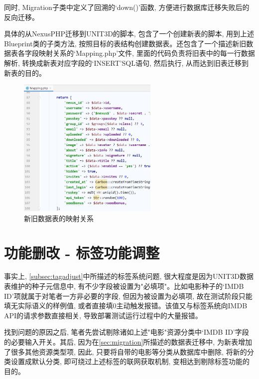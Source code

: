 同时, Migration子类中定义了回溯的`down()'函数, 方便进行数据库迁移失败后的反向迁移。

具体的从NexusPHP迁移到UNIT3D的脚本, 包含了一个创建新表的脚本, 用到上述Blueprint类的子类方法, 按照目标的表结构创建数据表。还包含了一个描述新旧数据表各字段映射关系的`Mapping.php'文件, 里面的代码负责将旧表中的每一行数据解析, 转换成新表对应字段的`INSERT'SQL语句, 然后执行, 从而达到旧表迁移到新表的目的。

\begin{figure}[ht]
    \centering
    \includegraphics[width=0.6\textwidth]{support-files/4.3-tjupt-to-unit3d-script-mapping.png}
    \caption{新旧数据表的映射关系}
    \label{fig:mapnexusphpunit3d}
\end{figure}



\section{功能删改 - 标签功能调整}

事实上, \ref{subsec:tagadjust}中所描述的标签系统问题, 很大程度是因为UNIT3D数据表维护的种子元信息中, 有不少字段被设置为"必填项"。比如电影种子的`IMDB ID'项就属于对笔者一方非必要的字段, 但因为被设置为必填项, 故在测试阶段只能填无实际语义的样例值, 或者直接填0主动触发报错。该值又与标签系统向IMDB API的请求参数直接相关, 导致部署测试运行过程中的大量报错。

找到问题的原因之后, 笔者先尝试剔除诸如上述"电影"资源分类中`IMDB ID'字段的必要输入开关。其后, 因为在\ref{sec:migration}所描述的数据表迁移中, 为新表增加了很多其他资源类型项, 因此, 只要将自带的电影等分类从数据库中删除, 将新的分类设置成默认分类, 即可绕过上述标签的联网获取机制, 变相达到剔除标签功能的目的。

